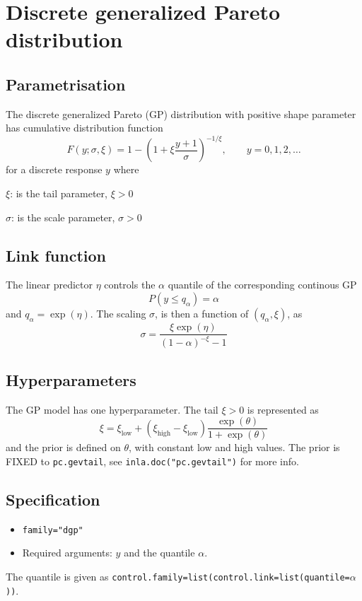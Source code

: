 \documentclass[12pt]{article}
\begin{document}
\section*{Discrete generalized Pareto distribution}
\subsection*{Parametrisation}
The discrete generalized Pareto (GP) distribution with positive shape parameter
has cumulative distribution function
$$
F(y;\sigma,\xi)=1-\left(1+\xi\frac{y+1}{\sigma}\right)^{-1/\xi},
\qquad y = 0, 1, 2, \ldots
$$
for a discrete response $y$ where
\begin{description}
\item $\xi$: is the tail parameter, $\xi>0$
\item $\sigma$: is the scale parameter, $\sigma>0$
\end{description}

\subsection*{Link function}

The linear predictor $\eta$ controls the $\alpha$ quantile of
the corresponding continous GP
\begin{displaymath}
    P(y \le q_{\alpha}) = \alpha
\end{displaymath}
and $q_{\alpha} = \exp(\eta)$. The scaling $\sigma$, is then a
function of $(q_{\alpha}, \xi)$, as
\begin{displaymath}
    \sigma = \frac{\xi\exp(\eta)}{(1-\alpha)^{-\xi}-1}
\end{displaymath}

\subsection*{Hyperparameters}
The $\mathrm{GP}$ model has one hyperparameter. The tail $\xi>0$ is
represented as
$$
\xi = \xi_{\text{low}} + (\xi_{\text{high}} - \xi_{\text{low}})
\frac{\exp(\theta)}{1 + \exp(\theta)}
$$
and the prior is defined on $\theta$, with constant low and high
values. The prior is FIXED to \texttt{pc.gevtail}, see
\texttt{inla.doc("pc.gevtail")} for more info.

\subsection*{Specification}
\begin{itemize}
\item \texttt{family="dgp"}
\item Required arguments: $y$ and the quantile $\alpha$. 
\end{itemize}
The quantile is given as \texttt{control.family=list(control.link=list(quantile=$\alpha$))}.
\end{document}
